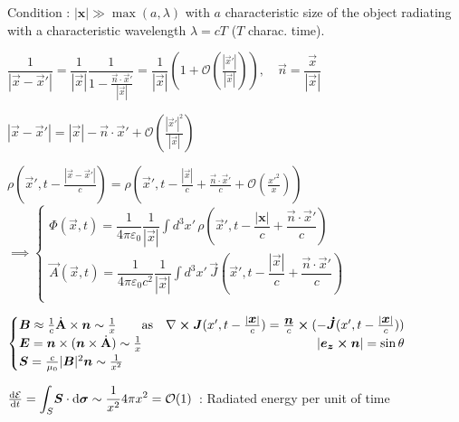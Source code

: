 Condition : $|\textbf{x}| \gg \max(a, \lambda)$ with $a$ characteristic size of the object radiating with a characteristic wavelength $\lambda = cT$ ($T$ charac. time).
\begin{squishlist}
\item $\dfrac{1}{|\vec{x}-\vec{x}'|} = \dfrac{1}{|\vec{x}|}\dfrac{1}{1- \frac{\vec{n} \cdot \vec{x}'}{|\vec{x}|}} = \dfrac{1}{|\vec{x}|}\left(1+\mathcal{O}(\frac{|\vec{x}'|}{|\vec{x}|})\right), \quad \vec{n} = \dfrac{\vec{x}}{|\vec{x}|}$

\item $|\vec{x}-\vec{x}'| = |\vec{x}| - \vec{n} \cdot \vec{x}' + \mathcal{O}(\frac{|\vec{x}'|^2}{|\vec{x}|})$

\item $\rho(\vec{x}', t - \frac{|\vec{x} - \vec{x}'|}{c}) = \rho (\vec{x}', t-\frac{|\vec{x}|}{c} + \frac{\vec{n}\cdot\vec{x}'}{c} + \mathcal{O}(\frac{x'^2}{x}))$
\\
$      \implies
\begin{cases}
\Phi(\vec{x},t) = \dfrac{1}{4\pi\varepsilon_0}\dfrac{1}{|\vec{x}|}\displaystyle{\int} d^3x' \, \rho(\vec{x}',t- \dfrac{|\textbf{x}|}{c} + \dfrac{\vec{n} \cdot \vec{x}'}{c}) \\
\vec{A}(\vec{x},t) = \dfrac{1}{4\pi\varepsilon_0c^2} \dfrac{1}{|\vec{x}|} \displaystyle{\int} d^3x' \, \vec{J}(\vec{x}',t- \dfrac{|\vec{x}|}{c} + \dfrac{\vec{n} \cdot \vec{x}'}{c}) \\
\end{cases}$

\item $        \begin{cases}
\vec{B} \approx \frac{1}{c}\dot{\vec{\rm{A}}} \times \vec{n} \sim \frac{1}{x} \qquad \text{as} \quad\nabla \cross \vec{J}(x',t-\frac{|\vec{x}|}{c}) = \frac{\vec{n}}{c} \cross (-{\vec{\dot{{J}}}}(x',t-\frac{|\vec{x}|}{c}))\\
\vec{E} = \vec{n} \times (\vec{n} \times \dot{\vec{\rm{A}}}) \sim \frac{1}{x} \hfill |\vec{e_z} \cross \vec{n}|=\sin\theta \\
\vec{S} = \frac{c}{\mu_0} |\vec{B}|^2\vec{n} \sim \frac{1}{x^2}\\
\end{cases}$

\item $ \frac{\textrm{d} \mathcal{E}}{\textrm{d} t} = \displaystyle{\int_{S}} \mbox{\boldmath$S$}\cdot \mbox{\boldmath$\textrm{d} \sigma$} \sim \frac{1}{x^2}4\pi x^2 = \mathcal{O}(1)\, $ : Radiated energy per unit of time\\

\end{squishlist} 

